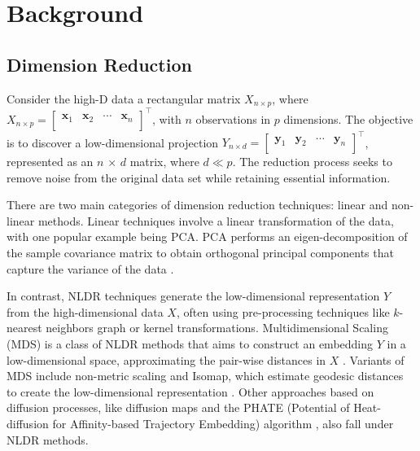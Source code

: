 \documentclass[
  12pt]{article}
\begin{document}
\hypertarget{sec-background}{%
\section{Background}\label{sec-background}}

\hypertarget{dimension-reduction}{%
\subsection{Dimension Reduction}\label{dimension-reduction}}

Consider the high-D data a rectangular matrix \(X_{n \times p}\), where
\(X_{n \times p} = \begin{bmatrix} \textbf{x}_{1} & \textbf{x}_{2} & \cdots & \textbf{x}_{n}\\ \end{bmatrix}^\top\),
with \(n\) observations in \(p\) dimensions. The objective is to
discover a low-dimensional projection
\(Y_{n \times d} = \begin{bmatrix} \textbf{y}_{1} & \textbf{y}_{2} & \cdots & \textbf{y}_{n}\\ \end{bmatrix}^\top\),
represented as an \(n\) × \(d\) matrix, where \(d \ll p\). The reduction
process seeks to remove noise from the original data set while retaining
essential information.

There are two main categories of dimension reduction techniques: linear
and non-linear methods. Linear techniques involve a linear
transformation of the data, with one popular example being PCA. PCA
performs an eigen-decomposition of the sample covariance matrix to
obtain orthogonal principal components that capture the variance of the
data \citep{Karl1901}.

In contrast, NLDR techniques generate the low-dimensional representation
\(Y\) from the high-dimensional data \(X\), often using pre-processing
techniques like \(k\)-nearest neighbors graph or kernel transformations.
Multidimensional Scaling (MDS) is a class of NLDR methods that aims to
construct an embedding \(Y\) in a low-dimensional space, approximating
the pair-wise distances in \(X\) \citep{Torgerson1967}. Variants of MDS
include non-metric scaling \citep{article62} and Isomap, which estimate
geodesic distances to create the low-dimensional representation
\citep{article63}. Other approaches based on diffusion processes, like
diffusion maps \citep{article64} and the PHATE (Potential of
Heat-diffusion for Affinity-based Trajectory Embedding) algorithm
\citep{article03}, also fall under NLDR methods.
\end{document}
